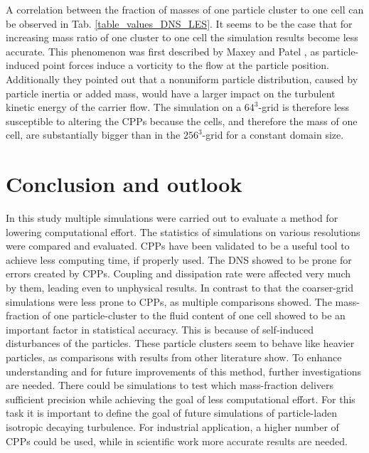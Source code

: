 \documentclass[11pt,a4paper,openany,oneside,parskip=half*]{article}
\begin{document}
A correlation between the fraction of masses of one particle cluster to one cell can be observed in Tab. \ref{table_values_DNS_LES}. It seems to be the case that for increasing mass ratio of one cluster to one cell the simulation results become less accurate. This phenomenon was first described by Maxey and Patel \cite{maxey1997simulations}, as particle-induced point forces induce a vorticity to the flow at the particle position. Additionally they pointed out that a nonuniform particle distribution, caused by particle inertia or added mass, would have a larger impact on the turbulent kinetic energy of the carrier flow.
\newline 
The simulation on a $64^3$-grid is therefore less susceptible to altering the CPPs because the cells, and therefore the mass of one cell, are substantially bigger than in the $256^3$-grid for a constant domain size.
\pagebreak
\section{Conclusion and outlook}
In this study multiple simulations were carried out to evaluate a method for lowering computational effort. The statistics of simulations on various resolutions were compared and evaluated. CPPs have been validated to be a useful tool to achieve less computing time, if properly used.
\newline
The DNS showed to be prone for errors created by CPPs. Coupling and dissipation rate were affected very much by them, leading even to unphysical results. In contrast to that the coarser-grid simulations were less prone to CPPs, as multiple comparisons showed. The mass-fraction of one particle-cluster to the fluid content of one cell showed to be an important factor in statistical accuracy. This is because of self-induced disturbances of the particles. These particle clusters seem to behave like heavier particles, as comparisons with results from other literature show.
\newline
To enhance understanding and for future improvements of this method, further investigations are needed. There could be simulations to test which mass-fraction delivers sufficient precision while achieving the goal of less computational effort. For this task it is important to define the goal of future simulations of particle-laden isotropic decaying turbulence. For industrial application, a higher number of CPPs could be used, while in scientific work more accurate results are needed. 
\newline
\pagebreak
\end{document}
